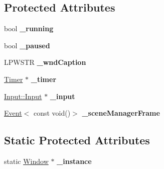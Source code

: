 \subsection*{Protected Attributes}
\begin{DoxyCompactItemize}
\item 
bool {\bfseries \+\_\+running}\hypertarget{class_ensum_1_1_core_1_1_window_a6424445161cec33a48906e90270ba20b}{}\label{class_ensum_1_1_core_1_1_window_a6424445161cec33a48906e90270ba20b}

\item 
bool {\bfseries \+\_\+paused}\hypertarget{class_ensum_1_1_core_1_1_window_a49015186ceadd7d1e12c4b4d2f506242}{}\label{class_ensum_1_1_core_1_1_window_a49015186ceadd7d1e12c4b4d2f506242}

\item 
L\+P\+W\+S\+TR {\bfseries \+\_\+wnd\+Caption}\hypertarget{class_ensum_1_1_core_1_1_window_a42e780f298c4b0ea9f7f68f855f43e98}{}\label{class_ensum_1_1_core_1_1_window_a42e780f298c4b0ea9f7f68f855f43e98}

\item 
\hyperlink{class_ensum_1_1_core_1_1_timer}{Timer} $\ast$ {\bfseries \+\_\+timer}\hypertarget{class_ensum_1_1_core_1_1_window_aa27d25534350ec8e46cf2eae67c82ea5}{}\label{class_ensum_1_1_core_1_1_window_aa27d25534350ec8e46cf2eae67c82ea5}

\item 
\hyperlink{class_ensum_1_1_input_1_1_input}{Input\+::\+Input} $\ast$ {\bfseries \+\_\+input}\hypertarget{class_ensum_1_1_core_1_1_window_a6b2925a490f7a5a2417059660713bc19}{}\label{class_ensum_1_1_core_1_1_window_a6b2925a490f7a5a2417059660713bc19}

\item 
\hyperlink{class_ensum_1_1_event}{Event}$<$ const void()$>$ {\bfseries \+\_\+scene\+Manager\+Frame}\hypertarget{class_ensum_1_1_core_1_1_window_a3590c66ab2e35d39305d587db08aeae5}{}\label{class_ensum_1_1_core_1_1_window_a3590c66ab2e35d39305d587db08aeae5}

\end{DoxyCompactItemize}
\subsection*{Static Protected Attributes}
\begin{DoxyCompactItemize}
\item 
static \hyperlink{class_ensum_1_1_core_1_1_window}{Window} $\ast$ {\bfseries \+\_\+instance}\hypertarget{class_ensum_1_1_core_1_1_window_aa4ca94e77186512ab2949dd6c7e850e6}{}\label{class_ensum_1_1_core_1_1_window_aa4ca94e77186512ab2949dd6c7e850e6}

\end{DoxyCompactItemize}


